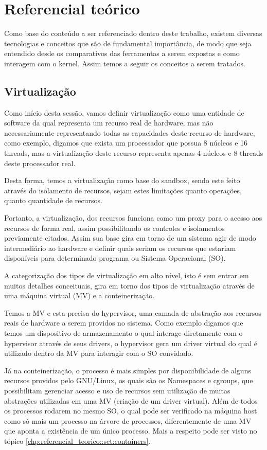 \chapter{Referencial teórico}
\label{chp:referencial_teorico}

Como base do conteúdo a ser referenciado dentro deste trabalho, existem diversas tecnologias e conceitos que são de fundamental importância, de modo que seja entendido desde os comparativos das ferramentas a serem expostas e como interagem com o kernel. Assim temos a seguir os conceitos a serem tratados.

\section{Virtualização}
Como início desta sessão, vamos definir virtualização como uma entidade de software da qual representa um recurso real de hardware, mas não necessariamente representando todas as capacidades deste recurso de hardware, como exemplo, digamos que exista um processador que possua 8 núcleos e 16 threads, mas a virtualização deste recurso representa apenas 4 núcleos e 8 threads deste processador real.

Desta forma, temos a virtualização como base do sandbox, sendo este feito através do isolamento de recursos, sejam estes limitações quanto operações, quanto quantidade de recursos.

Portanto, a virtualização, dos recursos funciona como um proxy para o acesso aos recursos de forma real, assim possibilitando os controles e isolamentos previamente citados. Assim sua base gira em torno de um sistema agir de modo intermediário ao hardware e definir quais seriam os recursos que estariam disponíveis para determinado programa ou Sistema Operacional (SO).

A categorização dos tipos de virtualização em alto nível, isto é sem entrar em muitos detalhes conceituais, gira em torno dos tipos de virtualização através de uma máquina virtual (MV) e a conteinerização.

Temos a MV e esta precisa do hypervisor, uma camada de abstração aos recursos reais de hardware a serem providos no sistema. Como exemplo digamos que temos um dispositivo de armazenamento o qual interage diretamente com o hypervisor através de seus drivers, o hypervisor  gera um driver virtual do qual é utilizado dentro da MV para interagir com o SO convidado.

Já na conteinerização, o processo é mais simples por disponibilidade de alguns recursos providos pelo GNU/Linux, os quais são os Namespaces e cgroups, que possibilitam gerenciar acesso e uso de recursos sem utilização de muitas abstrações utilizadas em uma MV (criação de um driver virtual). Além de todos os processos rodarem no mesmo SO, o qual pode ser verificado na máquina host como só mais um processo na árvore de processos, diferentemente de uma MV que aponta a existência de um único processo. Mais a respeito pode ser visto no tópico \ref{chp:referencial_teorico::sct:containers}.

